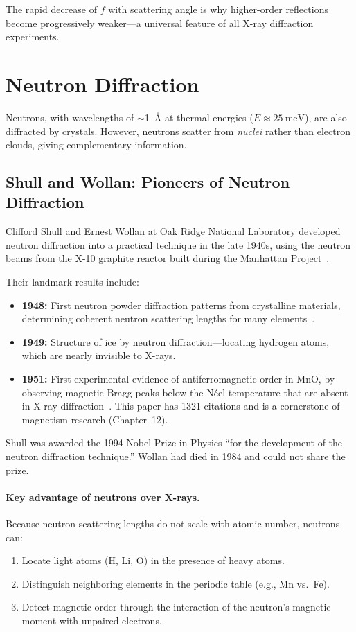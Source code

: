 The rapid decrease of $f$ with scattering angle is why higher-order reflections become progressively weaker---a universal feature of all X-ray diffraction experiments.


\section{Neutron Diffraction}

Neutrons, with wavelengths of $\sim$1~\AA{} at thermal energies ($E \approx \SI{25}{\milli\electronvolt}$), are also diffracted by crystals. However, neutrons scatter from \textit{nuclei} rather than electron clouds, giving complementary information.

\subsection{Shull and Wollan: Pioneers of Neutron Diffraction}

Clifford Shull and Ernest Wollan at Oak Ridge National Laboratory developed neutron diffraction into a practical technique in the late 1940s, using the neutron beams from the X-10 graphite reactor built during the Manhattan Project~\cite{shull1995nobel}.

Their landmark results include:

\begin{itemize}[nosep]
  \item \textbf{1948:} First neutron powder diffraction patterns from crystalline materials, determining coherent neutron scattering lengths for many elements~\cite{shull1951neutron}.
  \item \textbf{1949:} Structure of ice by neutron diffraction---locating hydrogen atoms, which are nearly invisible to X-rays.
  \item \textbf{1951:} First experimental evidence of antiferromagnetic order in MnO, by observing magnetic Bragg peaks below the N\'eel temperature that are absent in X-ray diffraction~\cite{shull1951neutron}. This paper has 1321 citations and is a cornerstone of magnetism research (Chapter~12).
\end{itemize}

Shull was awarded the 1994 Nobel Prize in Physics ``for the development of the neutron diffraction technique.'' Wollan had died in 1984 and could not share the prize.

\paragraph{Key advantage of neutrons over X-rays.} Because neutron scattering lengths do not scale with atomic number, neutrons can:
\begin{enumerate}[nosep]
  \item Locate light atoms (H, Li, O) in the presence of heavy atoms.
  \item Distinguish neighboring elements in the periodic table (e.g., Mn vs.\ Fe).
  \item Detect magnetic order through the interaction of the neutron's magnetic moment with unpaired electrons.
\end{enumerate}


